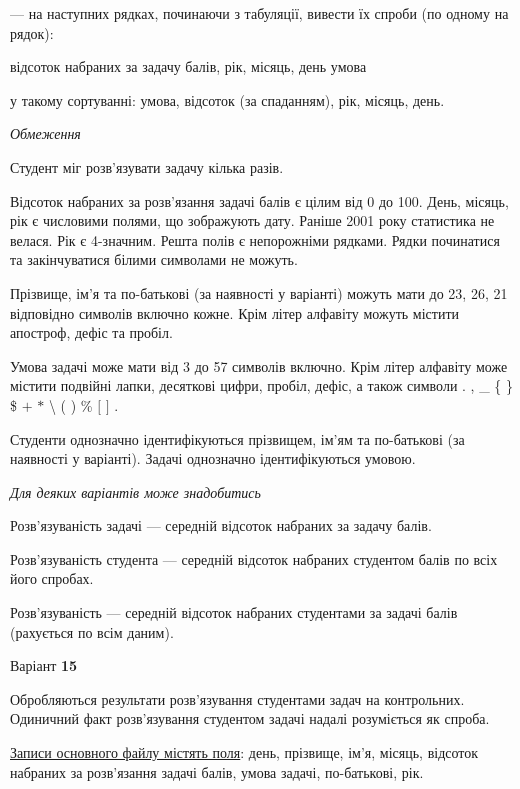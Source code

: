 \documentclass[11pt, ukrainian]{article}
\begin{document}
{\noindent}--- на наступних рядках, починаючи з табуляції, вивести їх спроби (по одному на рядок):\par
відсоток набраних за задачу балів, рік, місяць, день умова

{\noindent}у такому сортуванні: умова, відсоток (за спаданням), рік, місяць, день.


\bigskip\textit{Обмеження}

Студент міг розв’язувати задачу кілька разів.

Відсоток набраних за розв’язання задачі балів є цілим від 0 до 100.
День, місяць, рік є числовими полями, що зображують дату.
Раніше 2001 року статистика не велася. Рік є 4-значним.
Решта полів є непорожніми рядками.
Рядки починатися та закінчуватися білими символами не можуть.

Прізвище, ім’я та по-батькові (за наявності у варіанті) можуть мати до 23, 26, 21 відповідно символів включно кожне. 
Крім літер алфавіту можуть містити апостроф, дефіс та пробіл.

Умова задачі може мати від 3 до 57 символів включно.
Крім літер алфавіту може містити подвійні лапки, десяткові цифри, пробіл, дефіс,
а також символи . , \_ \{ \} \$ $+$ $*$ {\textbackslash} ( ) \% $[$ $]$ .

Студенти однозначно ідентифікуються прізвищем, ім’ям та по-батькові (за наявності у варіанті).
Задачі однозначно ідентифікуються умовою.

\bigskip\textit{Для деяких варіантів може знадобитись}

Розв'язуваність задачі --- середній відсоток набраних за задачу балів.

Розв'язуваність студента --- середній відсоток набраних студентом балів по всіх його спробах.

Розв'язуваність --- середній відсоток набраних студентами за задачі балів (рахується по всім даним).


\par
\newpage
{\center Варіант  \No \textbf { 15 }\par}
\bigskip
Обробляються результати розв’язування студентами задач на контрольних.
Одиничний факт роз\-в’я\-зу\-вання студентом задачі надалі розуміється як спроба.

\underline{Записи основного файлу містять поля}: день, прізвище, ім’я, місяць, відсоток набраних за розв’язан\-ня задачі балів, умова задачі, по-батькові, рік.
\end{document}
